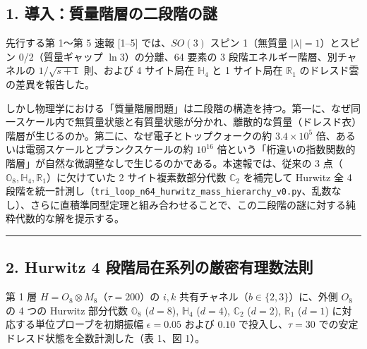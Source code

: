 \documentclass[
  a4paper,
]{ltjsarticle}
\begin{document}
\subsection{1.
導入：質量階層の二段階の謎}\label{ux5c0eux5165ux8ceaux91cfux968eux5c64ux306eux4e8cux6bb5ux968eux306eux8b0e}

先行する第 1〜第 5 速報 {[}1--5{]} では、\(SO(3)\) スピン 1（無質量
\(|\lambda| = 1\)）とスピン 0/2（質量ギャップ \(\ln 3\)）の分離、64
要素の 3 段階エネルギー階層、別チャネルの \(1/\sqrt{s+1}\) 則、および 4
サイト局在 \(\mathbb{H}_4\) と 1 サイト局在 \(\mathbb{R}_1\)
のドレスド雲の差異を報告した。

しかし物理学における「質量階層問題」は二段階の構造を持つ。第一に、なぜ同一スケール内で無質量状態と有質量状態が分かれ、離散的な質量（ドレスド衣）階層が生じるのか。第二に、なぜ電子とトップクォークの約
\(3.4 \times 10^5\) 倍、あるいは電弱スケールとプランクスケールの約
\(10^{16}\)
倍という「桁違いの指数関数的階層」が自然な微調整なしで生じるのかである。本速報では、従来の
3 点（\(\mathbb{O}_8, \mathbb{H}_4, \mathbb{R}_1\)）に欠けていた 2
サイト複素数部分代数 \(\mathbb{C}_2\) を補完して Hurwitz 全 4
段階を統一計測し（\texttt{tri\_loop\_n64\_hurwitz\_mass\_hierarchy\_v0.py}、乱数なし）、さらに直積準同型定理と組み合わせることで、この二段階の謎に対する純粋代数的な解を提示する。

\begin{center}\rule{0.5\linewidth}{0.5pt}\end{center}

\subsection{2. Hurwitz 4
段階局在系列の厳密有理数法則}\label{hurwitz-4-ux6bb5ux968eux5c40ux5728ux7cfbux5217ux306eux53b3ux5bc6ux6709ux7406ux6570ux6cd5ux5247}

第 1 層 \(H = O_8 \otimes M_8\)（\(\tau = 200\)）の \(i, k\)
共有チャネル（\(b \in \{2, 3\}\)）に、外側 \(O_8\) の 4 つの Hurwitz
部分代数 \(\mathbb{O}_8\) (\(d=8\)), \(\mathbb{H}_4\) (\(d=4\)),
\(\mathbb{C}_2\) (\(d=2\)), \(\mathbb{R}_1\) (\(d=1\))
に対応する単位プローブを初期振幅 \(\epsilon = 0.05\) および \(0.10\)
で投入し、\(\tau = 30\) での安定ドレスド状態を全数計測した（表 1、図
1）。
\end{document}
